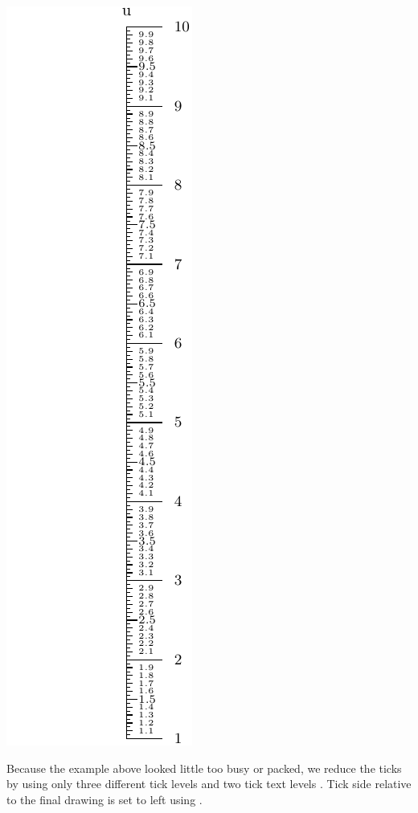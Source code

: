 \documentclass[a4paper,11pt,english]{sphinxmanual}
\begin{document}
\includegraphics{ex_axes_1.pdf}

Because the example above looked little too busy or packed, we reduce the ticks by using only three different tick levels
 and two tick text levels . Tick side relative to the final drawing is set to
left using .
\end{document}
